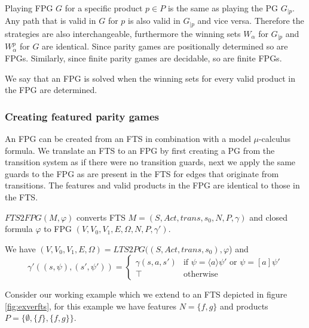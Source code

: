 Playing FPG $G$ for a specific product $p\in P$ is the same as playing the PG $G_{|p}$. Any path that is valid in $G$ for $p$ is also valid in $G_{|p}$ and vice versa. Therefore the strategies are also interchangeable, furthermore the winning sets $W_\alpha$ for $G_{|p}$ and $W_\alpha^p$ for $G$ are identical. Since parity games are positionally determined so are FPGs. Similarly, since finite parity games are decidable, so are finite FPGs.

We say that an FPG is solved when the winning sets for every valid product in the FPG are determined.
\subsubsection{Creating featured parity games}
An FPG can be created from an FTS in combination with a model $\mu$-calculus formula. We translate an FTS to an FPG by first creating a PG from the transition system as if there were no transition guards, next we apply the same guards to the FPG as are present in the FTS for edges that originate from transitions. The features and valid products in the FPG are identical to those in the FTS.
\begin{definition}
	\label{def_FTS2FPG}
	$FTS2FPG(M, \varphi)$ converts FTS $M = (S, Act, trans, s_0, N, P, \gamma)$ and closed formula $\varphi$ to FPG $(V, V_0, V_1, E, \Omega, N, P, \gamma')$.
	
	We have $(V, V_0, V_1, E, \Omega) = \textit{LTS2PG}((S, Act, trans, s_0), \varphi$) and
	\[ \gamma'((s, \psi),(s', \psi')) = \begin{cases}
	\gamma(s,a,s') & \text{if }\psi = \langle a \rangle \psi'\text{ or }\psi = [a]\psi' \\
	\top & \text{otherwise}
	\end{cases}\]
\end{definition}
Consider our working example which we extend to an FTS depicted in figure \ref{fig:exverfts}, for this example we have features $N = \{f, g\}$ and products $P = \{\emptyset, \{f\},\{f,g\}\}$.

